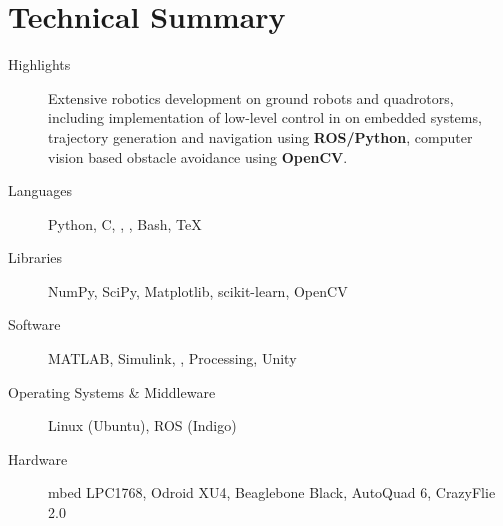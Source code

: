 \documentclass{simplecv}
\begin{document}
\maketitle
\vfill
\section{Technical Summary}
\begin{minipage}{\textwidth}
\begin{description}
    \item[Highlights]
        Extensive robotics development on ground robots and quadrotors, including implementation of low-level control in \textbf{\CPP} on embedded systems, trajectory generation and navigation using \textbf{ROS/Python}, computer vision based obstacle avoidance using \textbf{OpenCV}. 
\item[Languages]
    Python,
    C,
    \CPP,
    \CSharp,
    Bash,
    \TeX

\item[Libraries]
    NumPy,
    SciPy,
    Matplotlib,
    scikit-learn,
    OpenCV 

\item[Software]
    MATLAB,
  Simulink,
  ,
  Processing,
  Unity

\item[Operating Systems \& Middleware]
    Linux (Ubuntu),
    ROS (Indigo)
\item[Hardware]
    mbed LPC1768,
    Odroid XU4,
    Beaglebone Black,
    AutoQuad 6,
    CrazyFlie 2.0
\end{description}
\end{minipage}

\vfill
\end{document}
